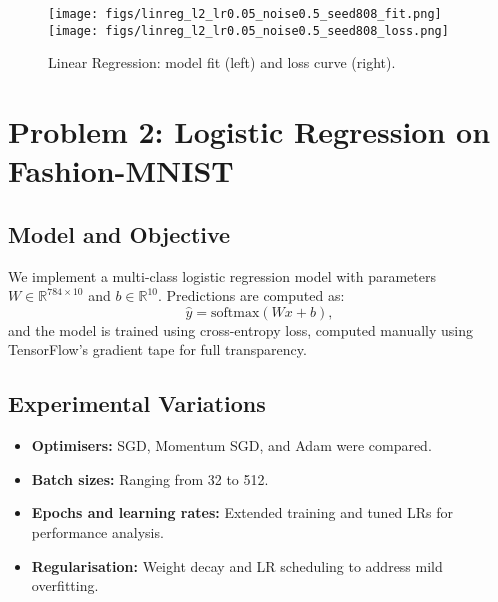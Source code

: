 \documentclass{article}
\begin{document}
\begin{figure}[t]
\centering
\texttt{[image: figs/linreg\_l2\_lr0.05\_noise0.5\_seed808\_fit.png]}\hfill
\texttt{[image: figs/linreg\_l2\_lr0.05\_noise0.5\_seed808\_loss.png]}
\caption{Linear Regression: model fit (left) and loss curve (right).}
\label{fig:lin}
\end{figure}

\section{Problem 2: Logistic Regression on Fashion-MNIST}
\subsection{Model and Objective}
We implement a multi-class logistic regression model with parameters $W \in \mathbb{R}^{784\times10}$ and $b \in \mathbb{R}^{10}$. Predictions are computed as:
\[
\hat{y} = \text{softmax}(Wx + b),
\]
and the model is trained using cross-entropy loss, computed manually using TensorFlow’s gradient tape for full transparency.

\subsection{Experimental Variations}
\begin{itemize}
    \item \textbf{Optimisers:} SGD, Momentum SGD, and Adam were compared.
    \item \textbf{Batch sizes:} Ranging from 32 to 512.
    \item \textbf{Epochs and learning rates:} Extended training and tuned LRs for performance analysis.
    \item \textbf{Regularisation:} Weight decay and LR scheduling to address mild overfitting.
\end{itemize}
\end{document}
